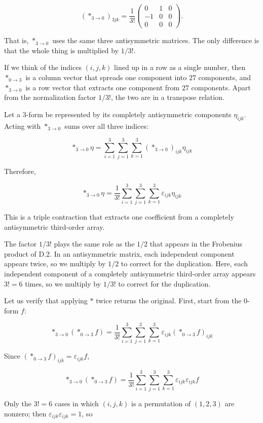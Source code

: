 \[
(\ast_{3\to0})_{3jk}
=
\frac{1}{3!}
\begin{pmatrix}
0&1&0\\
-1&0&0\\
0&0&0
\end{pmatrix}.
\]

That is, \(\ast_{3\to0}\) uses the same three antisymmetric matrices.
The only difference is that the whole thing is multiplied by \(1/3!\).

If we think of the indices \((i,j,k)\) lined up in a row as a single
number, then \(\ast_{0\to3}\) is a column vector that spreads one
component into \(27\) components, and \(\ast_{3\to0}\) is a row vector
that extracts one component from \(27\) components. Apart from the
normalization factor \(1/3!\), the two are in a transpose relation.

Let a \(3\)-form be represented by its completely antisymmetric
components \(\eta_{ijk}\). Acting with \(\ast_{3\to0}\) sums over all
three indices:

\[
\ast_{3\to0}\eta
=
\sum_{i=1}^{3}
\sum_{j=1}^{3}
\sum_{k=1}^{3}
(\ast_{3\to0})_{ijk}\eta_{ijk}
\]

Therefore,

\[
\ast_{3\to0}\eta
=
\frac{1}{3!}
\sum_{i=1}^{3}
\sum_{j=1}^{3}
\sum_{k=1}^{3}
\varepsilon_{ijk}\eta_{ijk}
\]

This is a triple contraction that extracts one coefficient from a
completely antisymmetric third-order array.

The factor \(1/3!\) plays the same role as the \(1/2\) that appears in
the Frobenius product of D.2. In an antisymmetric matrix, each
independent component appears twice, so we multiply by \(1/2\) to
correct for the duplication. Here, each independent component of a
completely antisymmetric third-order array appears \(3!=6\) times, so we
multiply by \(1/3!\) to correct for the duplication.

Let us verify that applying \(\ast\) twice returns the original. First,
start from the \(0\)-form \(f\):

\[
\ast_{3\to0}(\ast_{0\to3}f)
=
\frac{1}{3!}
\sum_{i=1}^{3}
\sum_{j=1}^{3}
\sum_{k=1}^{3}
\varepsilon_{ijk}(\ast_{0\to3}f)_{ijk}
\]

Since \((\ast_{0\to3}f)_{ijk}=\varepsilon_{ijk}f\),

\[
\ast_{3\to0}(\ast_{0\to3}f)
=
\frac{1}{3!}
\sum_{i=1}^{3}
\sum_{j=1}^{3}
\sum_{k=1}^{3}
\varepsilon_{ijk}\varepsilon_{ijk}f
\]

Only the \(3!=6\) cases in which \((i,j,k)\) is a permutation of
\((1,2,3)\) are nonzero; then \(\varepsilon_{ijk}\varepsilon_{ijk}=1\),
so

